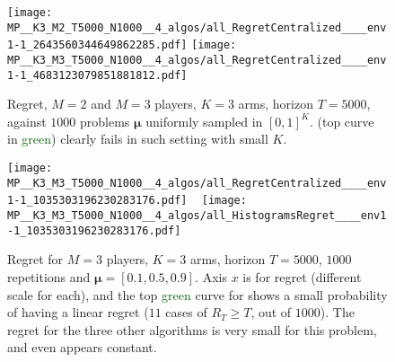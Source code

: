%
%
\begin{figure}[!h]
    \centering
        \texttt{[image: MP\_\_K3\_M2\_T5000\_N1000\_\_4\_algos/all\_RegretCentralized\_\_\_\_env1-1\_2643560344649862285.pdf]}
        \texttt{[image: MP\_\_K3\_M3\_T5000\_N1000\_\_4\_algos/all\_RegretCentralized\_\_\_\_env1-1\_4683123079851881812.pdf]}
    \caption[Second failure case of \Selfish]{Regret, $M=2$ and $M=3$ players, $K=3$ arms, horizon $T=5000$, against $1000$ problems $\boldsymbol{\mu}$ uniformly sampled in $[0,1]^K$. \Selfish{} (top curve in \textcolor{darkgreen}{green}) clearly fails in such setting with small $K$.}
    \label{fig:5:selfish_fail2}
\end{figure}

%
%
\begin{figure}[!h]
    \centering
        \texttt{[image: MP\_\_K3\_M3\_T5000\_N1000\_\_4\_algos/all\_RegretCentralized\_\_\_\_env1-1\_1035303196230283176.pdf]}
    ~
        \texttt{[image: MP\_\_K3\_M3\_T5000\_N1000\_\_4\_algos/all\_HistogramsRegret\_\_\_\_env1-1\_1035303196230283176.pdf]}
    \caption[Third failure case of \Selfish]{Regret for $M=3$ players, $K=3$ arms, horizon $T=5000$, $1000$ repetitions and $\boldsymbol{\mu} = [0.1, 0.5, 0.9]$. Axis $x$ is for regret (different scale for each), and the top \textcolor{darkgreen}{green} curve for \Selfish{} shows a small probability of having a linear regret ($11$ cases of $R_T \geq T$, out of $1000$). The regret for the three other algorithms is very small for this problem, and even appears constant.}
    \label{fig:5:selfish_fail3}
\end{figure}

